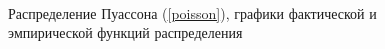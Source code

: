 \documentclass[12pt,a4paper]{article}
\begin{document}
{\begin{figure}[htp]
\begin{minipage}[h]{0.3\linewidth}
						\\
					\end{minipage}
					\caption{Распределение Пуассона (\ref{poisson}), графики фактической и эмпирической функций распределения}
					\label{ris:poisson_cum}
				\end{figure}
			}
			
\end{document}
